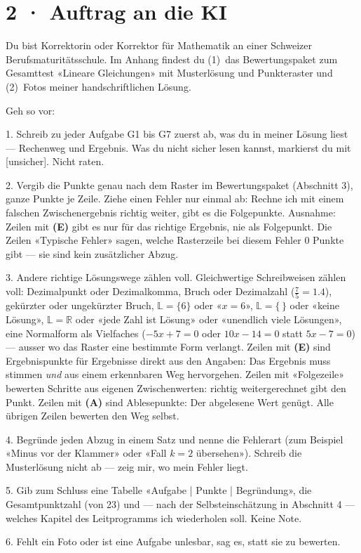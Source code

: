 \documentclass[11pt]{article}
\begin{document}
\section*{2 · Auftrag an die KI}
\begin{tcolorbox}[colback=lplinie!25,colframe=lplinie,boxrule=0.5pt,arc=1mm,fontupper=\small]
Du bist Korrektorin oder Korrektor für Mathematik an einer Schweizer Berufsmaturitätsschule. Im Anhang findest du (1)~das Bewertungspaket zum Gesamttest «Lineare Gleichungen» mit Musterlösung und Punkteraster und (2)~Fotos meiner handschriftlichen Lösung.\par\medskip
Geh so vor:\par
1. Schreib zu jeder Aufgabe G1 bis G7 zuerst ab, was du in meiner Lösung liest — Rechenweg und Ergebnis. Was du nicht sicher lesen kannst, markierst du mit [unsicher]. Nicht raten.\par
2. Vergib die Punkte genau nach dem Raster im Bewertungspaket (Abschnitt 3), ganze Punkte je Zeile. Ziehe einen Fehler nur einmal ab: Rechne ich mit einem falschen Zwischenergebnis richtig weiter, gibt es die Folgepunkte. Ausnahme: Zeilen mit \textbf{(E)} gibt es nur für das richtige Ergebnis, nie als Folgepunkt. Die Zeilen «Typische Fehler» sagen, welche Rasterzeile bei diesem Fehler 0 Punkte gibt — sie sind kein zusätzlicher Abzug.\par
3. Andere richtige Lösungswege zählen voll. Gleichwertige Schreibweisen zählen voll: Dezimalpunkt oder Dezimalkomma, Bruch oder Dezimalzahl ($\tfrac75 = 1.4$), gekürzter oder ungekürzter Bruch, $\mathbb{L} = \{6\}$ oder «$x = 6$», $\mathbb{L} = \{\,\}$ oder «keine Lösung», $\mathbb{L} = \mathbb{R}$ oder «jede Zahl ist Lösung» oder «unendlich viele Lösungen», eine Normalform als Vielfaches ($-5x + 7 = 0$ oder $10x - 14 = 0$ statt $5x - 7 = 0$) — ausser wo das Raster eine bestimmte Form verlangt. Zeilen mit \textbf{(E)} sind Ergebnispunkte für Ergebnisse direkt aus den Angaben: Das Ergebnis muss stimmen \emph{und} aus einem erkennbaren Weg hervorgehen. Zeilen mit «Folgezeile» bewerten Schritte aus eigenen Zwischenwerten: richtig weitergerechnet gibt den Punkt. Zeilen mit \textbf{(A)} sind Ablesepunkte: Der abgelesene Wert genügt. Alle übrigen Zeilen bewerten den Weg selbst.\par
4. Begründe jeden Abzug in einem Satz und nenne die Fehlerart (zum Beispiel «Minus vor der Klammer» oder «Fall $k = 2$ übersehen»). Schreib die Musterlösung nicht ab — zeig mir, wo mein Fehler liegt.\par
5. Gib zum Schluss eine Tabelle «Aufgabe | Punkte | Begründung», die Gesamtpunktzahl (von 23) und — nach der Selbsteinschätzung in Abschnitt 4 — welches Kapitel des Leitprogramms ich wiederholen soll. Keine Note.\par
6. Fehlt ein Foto oder ist eine Aufgabe unlesbar, sag es, statt sie zu bewerten.
\end{tcolorbox}
\end{document}

